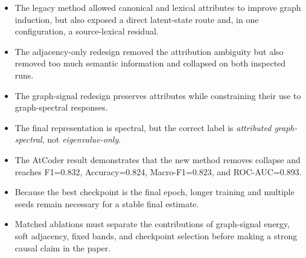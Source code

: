 \documentclass[11pt,a4paper]{article}
\begin{document}
\begin{itemize}
\item The legacy method allowed canonical and lexical attributes to improve
graph induction, but also exposed a direct latent-state route and, in one
configuration, a source-lexical residual.
\item The adjacency-only redesign removed the attribution ambiguity but also
removed too much semantic information and collapsed on both inspected runs.
\item The graph-signal redesign preserves attributes while constraining their
use to graph-spectral responses.
\item The final representation is spectral, but the correct label is
\emph{attributed graph-spectral}, not \emph{eigenvalue-only}.
\item The AtCoder result demonstrates that the new method removes collapse and
reaches F1=0.832, Accuracy=0.824, Macro-F1=0.823, and ROC-AUC=0.893.
\item Because the best checkpoint is the final epoch, longer training and
multiple seeds remain necessary for a stable final estimate.
\item Matched ablations must separate the contributions of graph-signal energy,
soft adjacency, fixed bands, and checkpoint selection before making a strong
causal claim in the paper.
\end{itemize}
\end{document}
